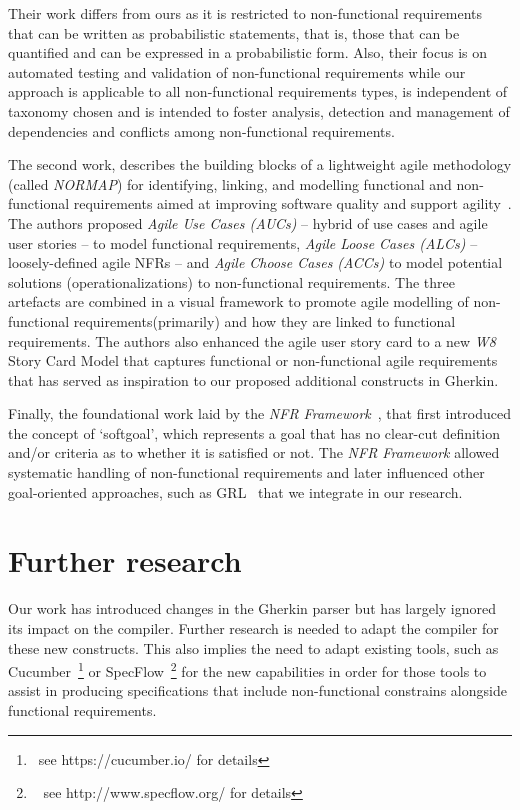 \documentclass[dissertation,final]{softeng}
\newcommand{\nfrs}{non-functional requirements\xspace}
\begin{document}
Their work differs from ours as it is restricted to \nfrs that can be written as probabilistic statements, that is, those that can be quantified and can be expressed in a probabilistic form. Also, their focus is on automated testing and validation of \nfrs while our approach is applicable to all \nfrs types, is independent of taxonomy chosen and is intended to foster analysis, detection and management of dependencies and conflicts among \nfrs.

The second work, describes the building blocks of a lightweight agile methodology (called \emph{NORMAP}) for identifying, linking, and modelling functional and non-functional requirements aimed at improving software quality and support agility~\citep{Farid1998}. The authors proposed \emph{Agile Use Cases (AUCs)} --  hybrid of use cases and agile user stories -- to model functional requirements, \emph{Agile Loose Cases (ALCs)} -- loosely-defined agile NFRs --  and \emph{Agile Choose Cases (ACCs)} to model potential solutions (operationalizations) to \nfrs. The three artefacts are combined in a visual framework to promote agile modelling of \nfrs (primarily) and how they are linked to functional requirements. The authors also enhanced the agile user story card to a new \emph{W8} Story Card Model that captures functional or non-functional agile requirements that has served as inspiration to our proposed additional constructs in Gherkin.

Finally, the foundational work laid by the \emph{NFR Framework}~\cite{Chung2000}, that first introduced the concept of `softgoal', which represents a goal that has no clear-cut definition and/or criteria as to whether it is satisfied or not. The \emph{NFR Framework} allowed systematic handling of \nfrs and later influenced other goal-oriented approaches, such as GRL~\cite{Amyot2003} that we integrate in our research.

\section{Further research}
Our work has introduced changes in the Gherkin parser but has largely ignored its impact on the compiler. Further research is needed to adapt the compiler for these new constructs. This also implies the need to adapt existing tools, such as Cucumber~\footnote{~see https://cucumber.io/ for details} or SpecFlow~\footnote{~ see http://www.specflow.org/ for details} for the new capabilities in order for those tools to assist in producing specifications that include non-functional constrains alongside functional requirements.
\end{document}
